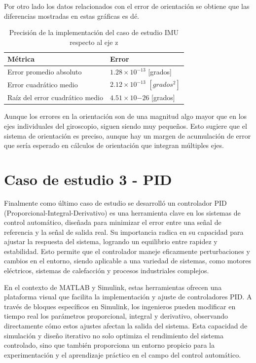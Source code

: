 Por otro lado los datos relacionados con el error de orientación se obtiene que las diferencias mostradas en estas gráficas es dé.

\begin{table}[htbp!]
    \centering
    \caption{Precisión de la implementación del caso de estudio IMU respecto al eje z}
    \label{tab:filter-errorzgrad}
    \begin{tabular}{ll}
    Métrica                       & Error \\ \hline
    Error promedio absoluto         &   $1.28 \times 10^{-13}$ [grados]\\
    Error cuadrático medio          &   $2.12 \times 10^{-13}$ $[grados^{2}]$    \\
    Raíz del error cuadrático medio &   $4.51 \times 10{-26}$ [grados]  
    \end{tabular}
    \end{table}


Aunque los errores en la orientación son de una magnitud algo mayor que en los ejes individuales del giroscopio, siguen siendo muy pequeños. Esto sugiere que el sistema de orientación es preciso, aunque hay un margen de acumulación de error que sería esperado en cálculos de orientación que integran múltiples ejes. 

\newpage

\section{Caso de estudio 3 - PID}

Finalmente como último caso de estudio se desarrolló un controlador PID (Proporcional-Integral-Derivativo) es una herramienta clave en los sistemas de control automático, diseñada para minimizar el error entre una señal de referencia y la señal de salida real. Su importancia radica en su capacidad para ajustar la respuesta del sistema, logrando un equilibrio entre rapidez y estabilidad. Esto permite que el controlador maneje eficazmente perturbaciones y cambios en el entorno, siendo aplicable a una variedad de sistemas, como motores eléctricos, sistemas de calefacción y procesos industriales complejos.

En el contexto de MATLAB y Simulink, estas herramientas ofrecen una plataforma visual que facilita la implementación y ajuste de controladores PID. A través de bloques específicos en Simulink, los ingenieros pueden modificar en tiempo real los parámetros proporcional, integral y derivativo, observando directamente cómo estos ajustes afectan la salida del sistema. Esta capacidad de simulación y diseño iterativo no solo optimiza el rendimiento del sistema controlado, sino que también proporciona un entorno propicio para la experimentación y el aprendizaje práctico en el campo del control automático.


